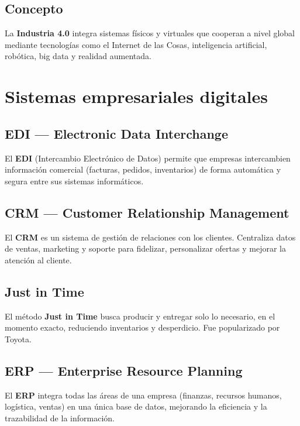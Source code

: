 \documentclass[11pt,a4paper]{article}
\begin{document}
\subsection{Concepto}
\begin{DefBox}
La \textbf{Industria 4.0} integra sistemas físicos y virtuales que cooperan a nivel global mediante tecnologías como el Internet de las Cosas, inteligencia artificial, robótica, big data y realidad aumentada.
\end{DefBox}

\section{Sistemas empresariales digitales}

\subsection{EDI — Electronic Data Interchange}
\begin{DefBox}
El \textbf{EDI} (Intercambio Electrónico de Datos) permite que empresas intercambien información comercial (facturas, pedidos, inventarios) de forma automática y segura entre sus sistemas informáticos.
\end{DefBox}

\subsection{CRM — Customer Relationship Management}
\begin{DefBox}
El \textbf{CRM} es un sistema de gestión de relaciones con los clientes. Centraliza datos de ventas, marketing y soporte para fidelizar, personalizar ofertas y mejorar la atención al cliente.
\end{DefBox}

\subsection{Just in Time}
\begin{DefBox}
El método \textbf{Just in Time} busca producir y entregar solo lo necesario, en el momento exacto, reduciendo inventarios y desperdicio. Fue popularizado por Toyota.
\end{DefBox}

\subsection{ERP — Enterprise Resource Planning}
\begin{DefBox}
El \textbf{ERP} integra todas las áreas de una empresa (finanzas, recursos humanos, logística, ventas) en una única base de datos, mejorando la eficiencia y la trazabilidad de la información.
\end{DefBox}
\end{document}
